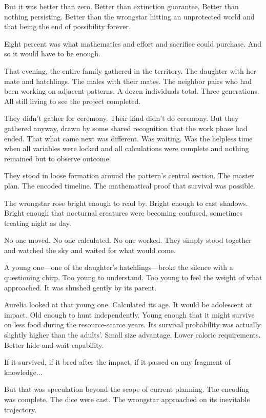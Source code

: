 But it was better than zero. Better than extinction guarantee. Better than nothing persisting. Better than the wrongstar hitting an unprotected world and that being the end of possibility forever.

Eight percent was what mathematics and effort and sacrifice could purchase. And so it would have to be enough.

\scenebreak

That evening, the entire family gathered in the territory. The daughter with her mate and hatchlings. The males with their mates. The neighbor pairs who had been working on adjacent patterns. A dozen individuals total. Three generations. All still living to see the project completed.

They didn't gather for ceremony. Their kind didn't do ceremony. But they gathered anyway, drawn by some shared recognition that the work phase had ended. That what came next was different. Was waiting. Was the helpless time when all variables were locked and all calculations were complete and nothing remained but to observe outcome.

They stood in loose formation around the pattern's central section. The master plan. The encoded timeline. The mathematical proof that survival was possible.

The wrongstar rose bright enough to read by. Bright enough to cast shadows. Bright enough that nocturnal creatures were becoming confused, sometimes treating night as day.

No one moved. No one calculated. No one worked. They simply stood together and watched the sky and waited for what would come.

A young one—one of the daughter's hatchlings—broke the silence with a questioning chirp. Too young to understand. Too young to feel the weight of what approached. It was shushed gently by its parent.

Aurelia looked at that young one. Calculated its age. It would be adolescent at impact. Old enough to hunt independently. Young enough that it might survive on less food during the resource-scarce years. Its survival probability was actually slightly higher than the adults'. Small size advantage. Lower caloric requirements. Better hide-and-wait capability.

If it survived, if it bred after the impact, if it passed on any fragment of knowledge...

But that was speculation beyond the scope of current planning. The encoding was complete. The dice were cast. The wrongstar approached on its inevitable trajectory.

